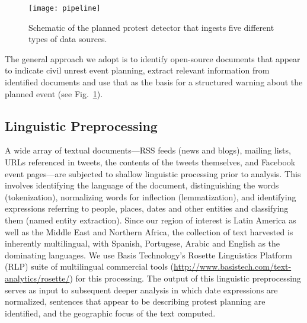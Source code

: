 \begin{figure}
\texttt{[image: pipeline]}
\vspace{-2em}
\caption{Schematic of the planned protest detector that ingests five
different types of data sources.}
\label{flowchart}
\end{figure}
The general approach we adopt is to identify open-source documents
that appear to indicate civil unrest event planning, extract
relevant information from identified documents and use that as the
basis for a structured warning about the planned event (see Fig.~\ref{flowchart}).

\vspace{-0.5em}
\subsection{Linguistic Preprocessing}

A wide array of textual documents---RSS feeds (news and blogs),
mailing lists, URLs referenced in tweets, the contents of the tweets
themselves, and Facebook event pages---are subjected to shallow
linguistic processing prior to analysis.  This involves identifying
the language of the document, distinguishing the words (tokenization),
normalizing words for inflection (lemmatization), and identifying
expressions referring to people, places, dates and other entities and
classifying them (named entity extraction).  Since our region of
interest is Latin America as well as the Middle East and Northern Africa, the collection of text harvested is
inherently multilingual, with Spanish, Portugese, Arabic and English as the
dominating languages. We use Basis Technology's Rosette Linguistics
Platform (RLP) suite of multilingual commercial tools
(\url{http://www.basistech.com/text-analytics/rosette/}) for this
processing.  The output of this linguistic preprocessing serves as input to
subsequent deeper analysis in which date expressions are normalized, sentences that
appear to be describing protest planning are identified, 
and the geographic focus of the text computed.

